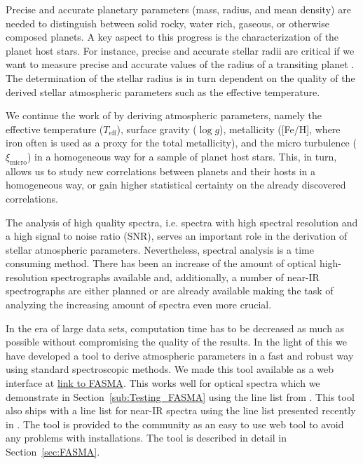 \documentclass{aa}
\begin{document}
Precise and accurate planetary parameters (mass, radius, and mean density) are
needed to distinguish between solid rocky, water rich, gaseous, or otherwise
composed planets. A key aspect to this progress is the characterization of the
planet host stars. For instance, precise and accurate stellar radii are critical
if we want to measure precise and accurate values of the radius of a transiting
planet \citep[see e.g.][]{Torres2012,Mortier2013}. The determination of the
stellar radius is in turn dependent on the quality of the derived stellar
atmospheric parameters such as the effective temperature.

We continue the work of \citet{Santos13} by deriving atmospheric parameters,
namely the effective temperature ($T_\mathrm{eff}$), surface gravity ($\log g$),
metallicity ([Fe/H], where iron often is used as a proxy for the total
metallicity), and the micro turbulence ($\xi_\mathrm{micro}$) in a homogeneous
way for a sample of planet host stars. This, in turn, allows us to study new
correlations between planets and their hosts in a homogeneous way,  or gain
higher statistical certainty on the already discovered correlations.

The analysis of high quality spectra, i.e. spectra with high spectral resolution
and a high signal to noise ratio (SNR), serves an important role in the
derivation of stellar atmospheric parameters. Nevertheless, spectral analysis is
a time consuming method. There has been an increase of the amount of  optical
high-resolution spectrographs available and, additionally, a number of near-IR
spectrographs are either planned or are already available making the task of
analyzing the increasing amount of spectra even more crucial.

In the era of large data sets, computation time has to be decreased as much as
possible without compromising the quality of the results. In the light of this
we have developed a tool to derive atmospheric parameters in a fast and robust
way using standard spectroscopic methods. We made this tool available as a web
interface at \url{link to FASMA}. This works well for optical spectra which we
demonstrate in Section~\ref{sub:Testing_FASMA} using the line list from
\citet{Sousa2011}. This tool also ships with a line list for near-IR spectra
using the line list presented recently in \citet{Andreasen2016}. The tool is
provided to the community as an easy to use web tool to avoid any problems with
installations. The tool is described in detail in Section~\ref{sec:FASMA}.
\end{document}
